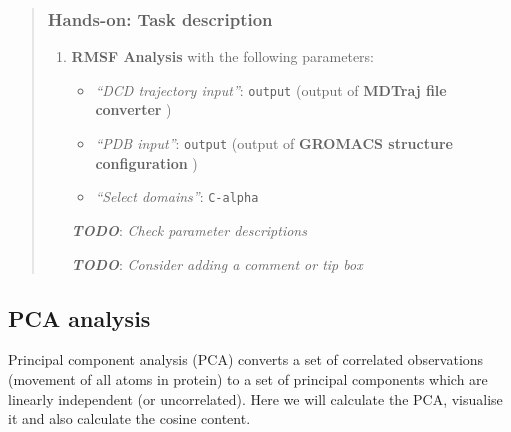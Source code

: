 \documentclass[twocolumn]{bmcart}%
\providecommand{\tightlist}{%
  \setlength{\itemsep}{0pt}\setlength{\parskip}{0pt}}
\providecommand{\tightlist}{%
  \setlength{\itemsep}{0pt}\setlength{\parskip}{0pt}}
\begin{document}
\begin{quote}
\hypertarget{hands-on-task-description-12}{%
\subsubsection{Hands-on: Task
description}\label{hands-on-task-description-12}}

\begin{enumerate}
\def\labelenumi{\arabic{enumi}.}
\tightlist
\item
  \textbf{RMSF Analysis} with the following parameters:

  \begin{itemize}
  \tightlist
  \item
    \emph{``DCD trajectory input''}: \texttt{output} (output of
    \textbf{MDTraj file converter} )
  \item
    \emph{``PDB input''}: \texttt{output} (output of \textbf{GROMACS
    structure configuration} )
  \item
    \emph{``Select domains''}: \texttt{C-alpha}
  \end{itemize}

  \textbf{\emph{TODO}}: \emph{Check parameter descriptions}

  \textbf{\emph{TODO}}: \emph{Consider adding a comment or tip box}
\end{enumerate}


\end{quote}


\hypertarget{pca-analysis}{%
\subsection{PCA analysis}\label{pca-analysis}}

Principal component analysis (PCA) converts a set of correlated
observations (movement of all atoms in protein) to a set of principal
components which are linearly independent (or uncorrelated). Here we
will calculate the PCA, visualise it and also calculate the cosine
content.
\end{document}
